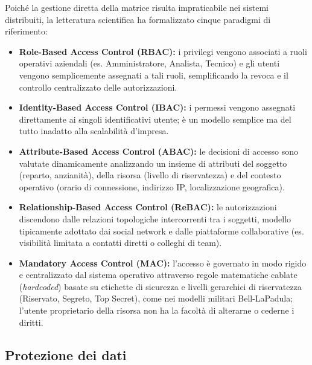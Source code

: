 \documentclass[../../main.tex]{subfiles}
\begin{document}
Poiché la gestione diretta della matrice risulta impraticabile nei sistemi distribuiti, la letteratura scientifica ha formalizzato cinque paradigmi di riferimento:
\begin{itemize}
    \item \textbf{Role-Based Access Control (RBAC):} i privilegi vengono associati a ruoli operativi aziendali (es. Amministratore, Analista, Tecnico) e gli utenti vengono semplicemente assegnati a tali ruoli, semplificando la revoca e il controllo centralizzato delle autorizzazioni.
    \item \textbf{Identity-Based Access Control (IBAC):} i permessi vengono assegnati direttamente ai singoli identificativi utente; è un modello semplice ma del tutto inadatto alla scalabilità d'impresa.
    \item \textbf{Attribute-Based Access Control (ABAC):} le decisioni di accesso sono valutate dinamicamente analizzando un insieme di attributi del soggetto (reparto, anzianità), della risorsa (livello di riservatezza) e del contesto operativo (orario di connessione, indirizzo IP, localizzazione geografica).
    \item \textbf{Relationship-Based Access Control (ReBAC):} le autorizzazioni discendono dalle relazioni topologiche intercorrenti tra i soggetti, modello tipicamente adottato dai social network e dalle piattaforme collaborative (es. visibilità limitata a contatti diretti o colleghi di team).
    \item \textbf{Mandatory Access Control (MAC):} l'accesso è governato in modo rigido e centralizzato dal sistema operativo attraverso regole matematiche cablate (\textit{hardcoded}) basate su etichette di sicurezza e livelli gerarchici di riservatezza (Riservato, Segreto, Top Secret), come nei modelli militari Bell-LaPadula; l'utente proprietario della risorsa non ha la facoltà di alterarne o cederne i diritti.
\end{itemize}

\subsection{Protezione dei dati}
\label{subsec:protezione_dati}
\end{document}
